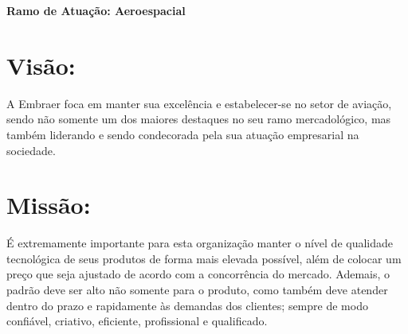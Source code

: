 \documentclass[
    12pt,               %
    openright,          %
    oneside,
    a4paper,            %
    draft,              %
    MODELO,             %
    TODO,               %
    english,            %
    brazil              %
    ]{ifsp-spo-inf-ctds}
\begin{document}
    \textbf{Ramo de Atuação: Aeroespacial}	
    
    
	\section{\textbf{Visão:}}
	A Embraer foca em manter sua excelência e estabelecer-se no setor de aviação, sendo não somente um dos maiores destaques no seu ramo mercadológico, mas também liderando e sendo condecorada pela sua atuação empresarial na sociedade.
	
	\section{\textbf{Missão:}}
	É extremamente importante para esta organização manter o nível de qualidade tecnológica de seus produtos de forma mais elevada possível, além de colocar um preço que seja ajustado de acordo com a concorrência do mercado.
Ademais, o padrão deve ser alto não somente para o produto, como também deve atender dentro do prazo e rapidamente às demandas dos clientes; sempre de modo confiável, criativo, eficiente, profissional e qualificado.

	
\end{document}
